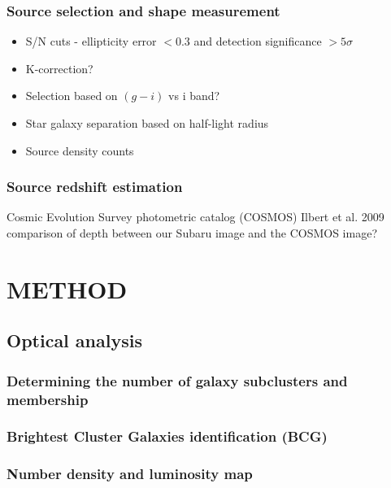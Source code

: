 \documentclass[letterpaper,useAMS,usenatbib]{mn2e}
\begin{document}
\subsubsection{Source selection and shape measurement}
\begin{itemize}
	\item S/N cuts - ellipticity error $< 0.3$ and detection significance $> 5\sigma$
	\item K-correction?
	\item Selection based on $(g-i)$ vs i band? 
	\item Star galaxy separation based on half-light radius 
	\item Source density counts   
\end{itemize}

\subsubsection{Source redshift estimation}
Cosmic Evolution Survey photometric catalog (COSMOS) 
Ilbert et al. 2009
comparison of depth between our Subaru image and the COSMOS image?

\section{METHOD}

\subsection{Optical analysis}
\subsubsection{Determining the number of galaxy subclusters and membership}
\subsubsection{Brightest Cluster Galaxies identification (BCG)}
\subsubsection{Number density and luminosity map}

% 
% 
% 
\end{document}
